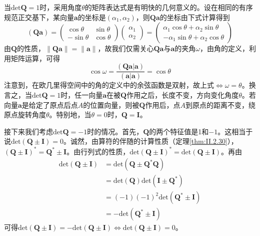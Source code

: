 \documentclass[main.tex]{subfiles}
\begin{document}
当$\mathrm{det}\mathbf{Q}=1$时，采用角度$\theta$的矩阵表达式是有明快的几何意义的。设在相同的有序规范正交基下，某向量$\mathbf{a}$的坐标是$\left(\alpha_1,\alpha_2\right)$，则$\mathbf{Qa}$的坐标由下式计算得到
\[\left(\mathbf{Qa}\right)=\left(\begin{array}{cc}\cos\theta&\sin\theta\\-\sin\theta&\cos\theta\end{array}\right)\left(\begin{array}{c}\alpha_1\\\alpha_2\end{array}\right)=\left(\begin{array}{c}\alpha_1\cos\theta+\alpha_2\sin\theta\\-\alpha_1\sin\theta+\alpha_2\cos\theta\end{array}\right)\]
由$\mathbf{Q}$的性质，$\left\|\mathbf{Qa}\right\|=\left\|\mathbf{a}\right\|$，故我们仅需关心$\mathbf{Qa}$与$\mathbf{a}$的夹角$\omega$，由角的定义，利用矩阵运算，可得
\[
    \cos\omega=\frac{\left(\mathbf{Qa}|\mathbf{a}\right)}{\left(\mathbf{a}|\mathbf{a}\right)}=\cos\theta
\]
注意到，在欧几里得空间中的角的定义中的余弦函数是双射，故上式$\Leftrightarrow\omega=\theta$。换言之，当$\mathrm{det}\mathbf{Q}=1$时，任一向量$\mathbf{a}$在被$\mathbf{Q}$作用之后，长度不变，方向变化角度$\theta$。若向量$\mathbf{a}$是给定了原点后点$A$的位置向量，则被$\mathbf{Q}$作用后，点$A$到原点的距离不变，绕原点旋转角度$\theta$。特别地，当$\theta=0$时，$\mathbf{Q}=\mathbf{I}$。

接下来我们考虑$\mathrm{det}\mathbf{Q}=-1$时的情况。首先，$\mathbf{Q}$的两个特征值是1和$-1$。这相当于说$\mathrm{det}\left(\mathbf{Q}\pm\mathbf{I}\right)=0$。诚然，由算符的伴随的计算性质（定理\ref{thm:II.2.30}），$\left(\mathbf{Q}\pm\mathbf{I}\right)^*=\mathbf{Q}^*\pm\mathbf{I}$。由行列式的性质，$\mathrm{det}\left(\mathbf{Q}\pm\mathbf{I}\right)^*=\mathrm{det}\left(\mathbf{Q}\pm\mathbf{I}\right)$。再由
\begin{align*}
    \mathrm{det}\left(\mathbf{Q}\pm\mathbf{I}\right) & =\mathrm{det}\left(\mathbf{Q}\pm\mathbf{Q}^*\mathbf{Q}\right)                          \\
                                                     & =\mathrm{det}\left(\mathbf{Q}\right)\mathrm{det}\left(\mathbf{I}\pm\mathbf{Q}^*\right) \\
                                                     & =\left(-1\right)\left(-1\right)^2\mathrm{det}\left(\mathbf{Q}^*\pm\mathbf{I}\right)    \\
                                                     & =-\mathrm{det}\left(\mathbf{Q}^*\pm\mathbf{I}\right)
\end{align*}
可得$\mathrm{det}\left(\mathbf{Q}\pm\mathbf{I}\right)=-\mathrm{det}\left(\mathbf{Q}\pm\mathbf{I}\right)\Leftrightarrow\mathrm{det}\left(\mathbf{Q}\pm\mathbf{I}\right)=0$。
\end{document}

